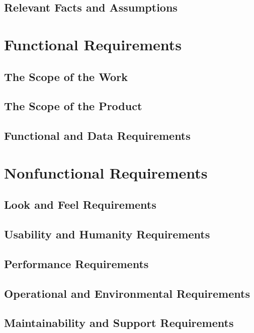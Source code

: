 \documentclass[notitlepage]{article}
\begin{document}
\begin{flushleft}
\subsection{Relevant Facts and Assumptions}


\section{Functional Requirements}

\subsection{The Scope of the Work}

\subsection{The Scope of the Product}

\subsection{Functional and Data Requirements}


\section{Nonfunctional Requirements}

\subsection{Look and Feel Requirements}

\subsection{Usability and Humanity Requirements}

\subsection{Performance Requirements}

\subsection{Operational and Environmental Requirements}

\subsection{Maintainability and Support Requirements}


\end{flushleft}
\end{document}
